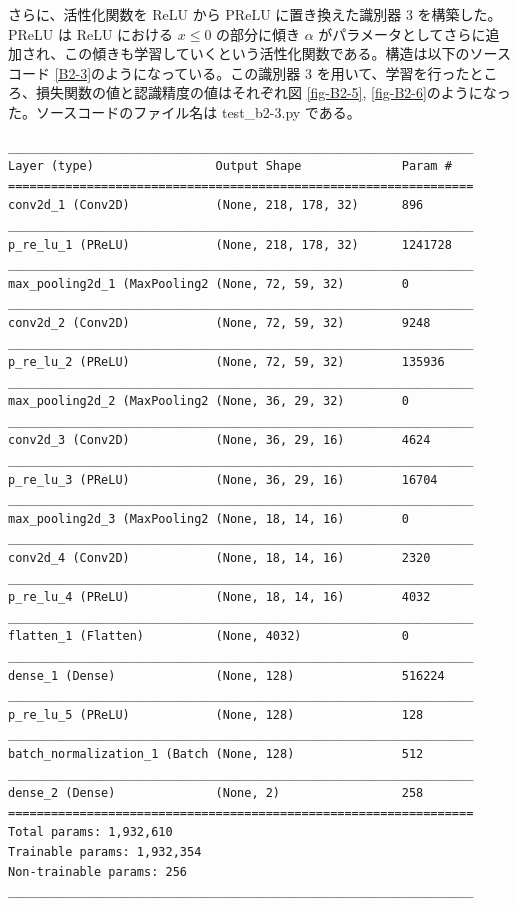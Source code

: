 \documentclass[a4paper,dvipdfmx]{jsarticle}
\begin{document}
さらに、活性化関数を ReLU から PReLU に置き換えた識別器 3 を構築した。PReLU は ReLU における $x \leq 0$ の部分に傾き $\alpha$ がパラメータとしてさらに追加され、この傾きも学習していくという活性化関数である。構造は以下のソースコード \ref{B2-3}のようになっている。この識別器 3 を用いて、学習を行ったところ、損失関数の値と認識精度の値はそれぞれ図 \ref{fig-B2-5}, \ref{fig-B2-6}のようになった。ソースコードのファイル名は test\_b2-3.py である。
\begin{lstlisting}[caption="識別器 3",label=B2-3]
_________________________________________________________________
Layer (type)                 Output Shape              Param #
=================================================================
conv2d_1 (Conv2D)            (None, 218, 178, 32)      896
_________________________________________________________________
p_re_lu_1 (PReLU)            (None, 218, 178, 32)      1241728
_________________________________________________________________
max_pooling2d_1 (MaxPooling2 (None, 72, 59, 32)        0
_________________________________________________________________
conv2d_2 (Conv2D)            (None, 72, 59, 32)        9248
_________________________________________________________________
p_re_lu_2 (PReLU)            (None, 72, 59, 32)        135936
_________________________________________________________________
max_pooling2d_2 (MaxPooling2 (None, 36, 29, 32)        0
_________________________________________________________________
conv2d_3 (Conv2D)            (None, 36, 29, 16)        4624
_________________________________________________________________
p_re_lu_3 (PReLU)            (None, 36, 29, 16)        16704
_________________________________________________________________
max_pooling2d_3 (MaxPooling2 (None, 18, 14, 16)        0
_________________________________________________________________
conv2d_4 (Conv2D)            (None, 18, 14, 16)        2320
_________________________________________________________________
p_re_lu_4 (PReLU)            (None, 18, 14, 16)        4032
_________________________________________________________________
flatten_1 (Flatten)          (None, 4032)              0
_________________________________________________________________
dense_1 (Dense)              (None, 128)               516224
_________________________________________________________________
p_re_lu_5 (PReLU)            (None, 128)               128
_________________________________________________________________
batch_normalization_1 (Batch (None, 128)               512
_________________________________________________________________
dense_2 (Dense)              (None, 2)                 258
=================================================================
Total params: 1,932,610
Trainable params: 1,932,354
Non-trainable params: 256
_________________________________________________________________
\end{lstlisting}
\end{document}
